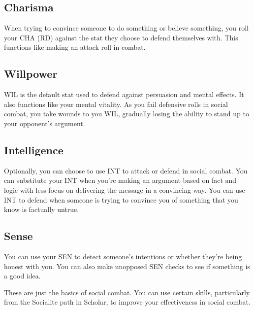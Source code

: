 \begin{multicols}{2}
\subsection{Charisma}
When trying to convince someone to do something or believe something, you roll your CHA (RD) against the stat they choose to defend themselves with. This functions like making an attack roll in combat.

\subsection{Willpower}
WIL is the default stat used to defend against persuasion and mental effects. It also functions like your mental vitality. As you fail defensive rolls in social combat, you take wounds to you WIL, gradually losing the ability to stand up to your opponent's argument.

\subsection{Intelligence}
Optionally, you can choose to use INT to attack or defend in social combat. You can substitute your INT when you're making an argument based on fact and logic with less focus on delivering the message in a convincing way. You can use INT to defend when someone is trying to convince you of something that you know is factually untrue.

\subsection{Sense}
You can use your SEN to detect someone's intentions or whether they're being honest with you. You can also make unopposed SEN checks to see if something is a good idea.

These are just the basics of social combat. You can use certain skills, particularly from the Socialite path in Scholar, to improve your effectiveness in social combat.

\end{multicols}